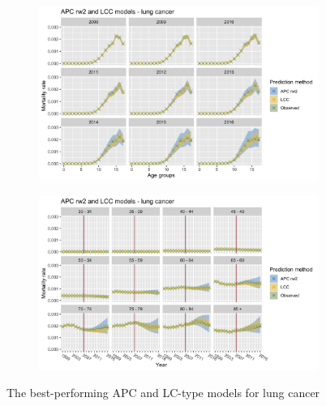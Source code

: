 \begin{figure}[h!]
    \centering
    \begin{subfigure}[b]{.45\linewidth}
        \includegraphics[width=\linewidth]{real-data/real-data-univariate/Figures/univariate-comparison-by-age-lung.png}
    \end{subfigure}
    \begin{subfigure}[b]{.45\linewidth}
        \includegraphics[width=\linewidth]{real-data/real-data-univariate/Figures/univariate-comparison-by-period-lung.png}
    \end{subfigure}
    \caption{The best-performing APC and LC-type models for lung cancer}
    \label{fig:uv-comparison-lung}
\end{figure}

